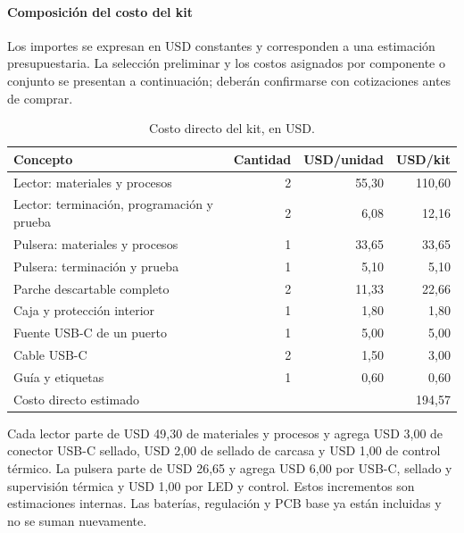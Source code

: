 \paragraph{Composición del costo del kit}
Los importes se expresan en USD constantes y corresponden a una estimación presupuestaria. La selección preliminar y los costos asignados por componente o conjunto se presentan a continuación; deberán confirmarse con cotizaciones antes de comprar.
\begin{table}[H]\centering\caption{Costo directo del kit, en USD.}\label{tab:costo-kit}\begin{tabular}{lrrr}\hline
Concepto & Cantidad & USD/unidad & USD/kit\\\hline
Lector: materiales y procesos & 2 & 55,30 & 110,60\\
Lector: terminación, programación y prueba & 2 & 6,08 & 12,16\\
Pulsera: materiales y procesos & 1 & 33,65 & 33,65\\
Pulsera: terminación y prueba & 1 & 5,10 & 5,10\\
Parche descartable completo & 2 & 11,33 & 22,66\\
Caja y protección interior & 1 & 1,80 & 1,80\\
Fuente USB-C de un puerto & 1 & 5,00 & 5,00\\
Cable USB-C & 2 & 1,50 & 3,00\\
Guía y etiquetas & 1 & 0,60 & 0,60\\\hline
Costo directo estimado & & & 194,57\\\hline
\end{tabular}\end{table}
Cada lector parte de USD 49,30 de materiales y procesos y agrega USD 3,00 de conector USB-C sellado, USD 2,00 de sellado de carcasa y USD 1,00 de control térmico. La pulsera parte de USD 26,65 y agrega USD 6,00 por USB-C, sellado y supervisión térmica y USD 1,00 por LED y control. Estos incrementos son estimaciones internas. Las baterías, regulación y PCB base ya están incluidas y no se suman nuevamente.

